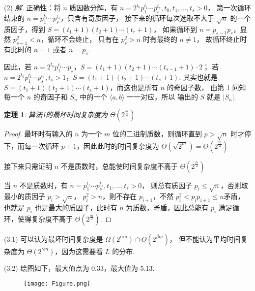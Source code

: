 \documentclass[UTF8]{ctexart}
\newtheorem{theorem}{定理}
\begin{document}
(2) \textit{解.} 正确性：将 $n$ 质因数分解，有 $n=2^{t_0}p_1^{t_1}\cdots p_s^{t_s},t_0,t_1,\ldots,t_s>0$，
第一次循环结束的 $n=p_1^{t_1}\cdots p_s^{t_s}$，只含有奇质因子，
接下来的循环每次选取不大于 $\sqrt{n}$ 的一个质因子，得到 $S=(t_1+1)(t_2+1)\cdots(t_r+1)$，
如果循环到 $n=p_{s-1}p_s$，显然 $p_{s-1}^2<n$，循环不会终止，
只有在 $p_s^2>n$ 时有最终的 $n\neq1$，
故循环终止时有此时的 $n=1$ 或者 $n=p_s$.

因此，若 $n=2^{t_0}p_1^{t_1}\cdots p_s$，$S=(t_1+1)(t_2+1)\cdots(t_{s-1}+1)\cdot 2$；
若 $n=2^{t_0}p_1^{t_1}\cdots p_s^{t_s},t_s>1$，$S=(t_1+1)(t_2+1)\cdots(t_s+1)$.
其实也就是 $S=(t_1+1)(t_2+1)\cdots(t_s+1)$，而这也是所有 $n$ 的奇因子数，
由第 1 问知每一个 $n$ 的奇因子和 $S_n$ 中的一个 $\langle a,b\rangle$ 一一对应，所以
输出的 $S$ 就是 $|S_n|$.

\begin{theorem}
    算法1的最坏时间复杂度为 $\Theta(2^{\frac{m}{2}})$
\end{theorem}

\begin{proof}
    最坏时有输入的 $n$ 为一个 $m$ 位的二进制质数，则循环直到 $p>\sqrt{n}$
    时才停下，而每一次循环 $p+1$，因此此时的时间复杂度为 $\Theta(\sqrt{2^m})=\Theta(2^{\frac{m}{2}})$

    接下来只需证明 $n$ 不是质数时，总能使时间复杂度不高于 $\Theta(2^{\frac{m}{2}})$

    当 $n$ 不是质数时，有 $n=p_1^{t_1}\cdots p_s^{t_s},t_1,\ldots,t_s>0$，
    则总有质因子 $p_i\leqslant\sqrt{n}$，否则取最小的质因子 $p_i>\sqrt{n}$，
    $p_i^2>n$，则不存在 $p_{i+1}$，不然 $p_i^2<p_{i}p_{i+1}\leqslant n$矛盾，
    也就是 $p_i$ 也是最大的质因子，此时有 $n$ 为质数，矛盾，因此总能有 $p_i$
    满足循环，使得复杂度不高于 $\Theta(2^{\frac{m}{2}})$.
\end{proof}

(3.1) 可以认为最坏时间复杂度是 $\Omega(2^{\alpha m})\cap O(2^{\beta m})$，
但不能认为平均时间复杂度为 $\Theta(2^{\gamma m})$，因为这需要看 $L$ 的分布.

(3.2) 绘图如下，最大值点为 0.33，最大值为 5.13.

\begin{figure}[htbp]
    \begin{center}
        \texttt{[image: Figure.png]}    
    \end{center}
\end{figure}
\end{document}
